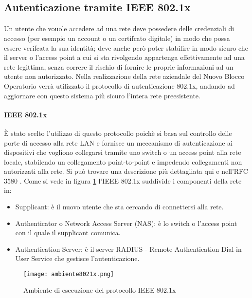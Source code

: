 \subsection{Autenticazione tramite IEEE 802.1x}
\paragraph{} Un utente che vouole accedere ad una rete deve possedere delle credenziali di accesso (per esempio un account o un certifcato digitale) in modo che possa essere verifcata la sua identità; deve anche però poter stabilire in modo sicuro che il server o l'access point a cui si sta rivolgendo appartenga effettivamente ad una rete legittima, senza correre il rischio di fornire le proprie informazioni ad un utente non autorizzato. 
Nella realizzazione della rete aziendale del Nuovo Blocco Operatorio verrà utilizzato il protocollo di autenticazione 802.1x, andando ad aggiornare con questo sistema più sicuro l'intera rete preesistente.
\paragraph{IEEE 802.1x}
È stato scelto l'utilizzo di questo protocollo poichè si basa sul controllo delle porte di accesso alla rete LAN e fornisce un meccanismo di autenticazione ai dispositivi che vogliono collegarsi tramite uno switch o un access point alla rete locale, stabilendo un collegamento point-to-point e impedendo collegamenti non autorizzati alla rete. Si può trovare una descrizione più dettagliata qui \cite{csc1} e nell'RFC 3580 \cite{rfc1}.
Come si vede in figura \ref{fig:amb} l'IEEE 802.1x suddivide i componenti della rete in:
\begin{itemize}
    \item Supplicant: è il nuovo utente che sta cercando di connettersi alla rete.
    \item Authenticator o Network Access Server (NAS): è lo switch o l'access point con il quale il supplicant comunica.
    \item Authentication Server: è il server RADIUS - Remote Authentication Dial-in User Service che gestisce l'autenticazione.
\end{itemize}

\begin{figure}[h]
  \centering
  \texttt{[image: ambiente8021x.png]}
  \caption{Ambiente di esecuzione del protocollo IEEE 802.1x}
  \label{fig:amb}
\end{figure}
